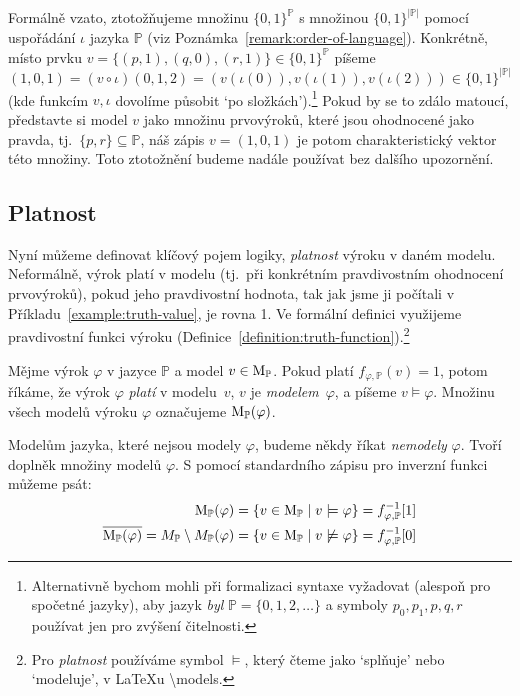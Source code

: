 \begin{remark}
Formálně vzato, ztotožňujeme množinu $\{0,1\}^\mathbb P$ s množinou $\{0,1\}^{|\mathbb P|}$ pomocí uspořádání $\iota$ jazyka $\mathbb P$ (viz Poznámka~\ref{remark:order-of-language}). Konkrétně, místo prvku $v=\{(p,1),(q,0),(r,1)\}\in\{0,1\}^\mathbb P$ píšeme $(1,0,1)=(v\circ\iota)(0,1,2)=(v(\iota(0)),v(\iota(1)),v(\iota(2)))\in\{0,1\}^{|\mathbb P|}$ (kde funkcím $v,\iota$ dovolíme působit `po složkách').\footnote{Alternativně bychom mohli při formalizaci syntaxe vyžadovat (alespoň pro spočetné jazyky), aby jazyk \emph{byl} $\mathbb P=\{0,1,2,\dots\}$ a symboly $p_0,p_1,p,q,r$ používat jen pro zvýšení čitelnosti.} Pokud by se to zdálo matoucí, představte si model $v$ jako množinu prvovýroků, které jsou ohodnocené jako pravda, tj.\ $\{p,r\}\subseteq\mathbb P$, náš zápis $v=(1,0,1)$ je potom charakteristický vektor této množiny. Toto ztotožnění budeme nadále používat bez dalšího upozornění.
\end{remark}


\subsection{Platnost}

Nyní můžeme definovat klíčový pojem logiky, \emph{platnost} výroku v daném modelu. Neformálně, výrok platí v modelu (tj.\ při konkrétním pravdivostním ohodnocení prvovýroků), pokud jeho pravdivostní hodnota, tak jak jsme ji počítali v Příkladu~\ref{example:truth-value}, je rovna 1. Ve formální definici využijeme pravdivostní funkci výroku (Definice~\ref{definition:truth-function}).\footnote{Pro \emph{platnost} používáme symbol $\models$, který čteme jako `splňuje' nebo `modeluje', v {\LaTeX}u {\textbackslash}models.}

\begin{definition}\label{definition:validity}
    Mějme výrok $\varphi$ v jazyce $\mathbb P$ a model $v\in\operatorname{M}_\mathbb P$. Pokud platí $f_{\varphi,\mathbb P}(v)=1$, potom říkáme, že výrok $\varphi$ \emph{platí} v modelu~$v$, $v$ je \emph{modelem}~$\varphi$, a píšeme $v\models\varphi$. Množinu všech modelů výroku $\varphi$ označujeme $\operatorname{M}_\mathbb P(\varphi)$.
\end{definition}
Modelům jazyka, které nejsou modely $\varphi$, budeme někdy říkat \emph{nemodely} $\varphi$. Tvoří doplněk množiny modelů $\varphi$. S pomocí standardního zápisu pro inverzní funkci můžeme psát:
\begin{align*}
    \operatorname{M}_\mathbb P(\varphi)&=\{v\in\operatorname{M}_\mathbb P\mid v\models \varphi\}=f_{\varphi,\mathbb P}^{-1}[1]\\
    \overline{\operatorname{M}_\mathbb P(\varphi)}=M_\mathbb P\setminus M_\mathbb P(\varphi)&=\{v\in\operatorname{M}_\mathbb P\mid v\not\models \varphi\}=f_{\varphi,\mathbb P}^{-1}[0]
\end{align*}

